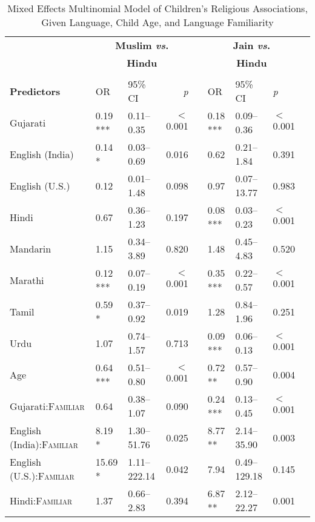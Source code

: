 \begin{table}[ht]
\small
\caption{Mixed Effects Multinomial Model of Children's Religious Associations, Given Language, Child Age, and Language Familiarity}
    \centering
    \vspace{5pt}
    \setlength{\tabcolsep}{1.75pt} 
\begin{threeparttable}
\begin{tabular}{lllrllllr}
\toprule
\midrule
& \multicolumn{3}{c}{\textbf{Muslim \textit{vs}.}} & & \multicolumn{3}{c}{\textbf{Jain \textit{vs}.}}\\
& \multicolumn{3}{c}{\textbf{Hindu}\tnote{a}} & & \multicolumn{3}{c}{\textbf{Hindu}\tnote{a}}\\
\cline{2-4} \cline{6-8} \\[-.75em]
\textbf{Predictors} & OR & 95\% CI & \textit{p} & & OR & 95\% CI & \textit{p} \\ 
\midrule
Gujarati & 0.19 *** & 0.11--0.35 & $<$0.001 &  & 0.18 *** & 0.09--0.36 & $<$0.001 \\ 
English (India) & 0.14 * & 0.03--0.69 & 0.016 &  & 0.62 & 0.21--1.84 & 0.391 \\ 
English (U.S.) & 0.12 & 0.01--1.48 & 0.098 &  & 0.97 & 0.07--13.77 & 0.983 \\ 
Hindi & 0.67 & 0.36--1.23 & 0.197 &  & 0.08 *** & 0.03--0.23 & $<$0.001 \\ 
Mandarin & 1.15 & 0.34--3.89 & 0.820 &  & 1.48 & 0.45--4.83 & 0.520 \\ 
Marathi & 0.12 *** & 0.07--0.19 & $<$0.001 &  & 0.35 *** & 0.22--0.57 & $<$0.001 \\ 
Tamil & 0.59 * & 0.37--0.92 & 0.019 &  & 1.28 & 0.84--1.96 & 0.251 \\ 
Urdu & 1.07 & 0.74--1.57 & 0.713 &  & 0.09 *** & 0.06--0.13 & $<$0.001 \\ 
Age\tnote{b} & 0.64 *** & 0.51--0.80 & $<$0.001 &  & 0.72 ** & 0.57--0.90 & 0.004 \\ 
Gujarati:\textsc{Familiar} & 0.64 & 0.38--1.07 & 0.090 &  & 0.24 *** & 0.13--0.45 & $<$0.001 \\ 
English (India):\textsc{Familiar} & 8.19 * & 1.30--51.76 & 0.025 &  & 8.77 ** & 2.14--35.90 & 0.003 \\ 
English (U.S.):\textsc{Familiar} & 15.69 * & 1.11--222.14 & 0.042 &  & 7.94 & 0.49--129.18 & 0.145 \\ 
Hindi:\textsc{Familiar} & 1.37 & 0.66--2.83 & 0.394 &  & 6.87 ** & 2.12--22.27 & 0.001 \\ 

\end{tabular}
\end{threeparttable}
\end{table}
